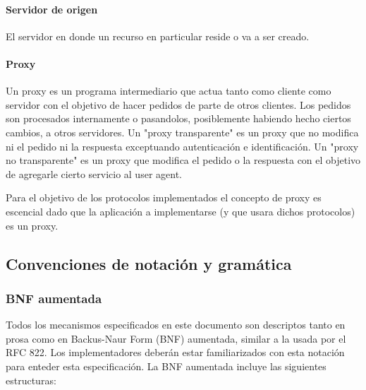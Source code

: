 \documentclass[a4paper,10pt]{article}
\begin{document}
            \paragraph*{Servidor de origen}

            El servidor en donde un recurso en particular reside o va a ser creado.

            \paragraph*{Proxy}

            Un proxy es un programa intermediario que actua tanto como cliente como servidor 
            con el objetivo de hacer pedidos de parte de otros clientes. Los pedidos son procesados internamente 
            o pasandolos, posiblemente habiendo hecho ciertos cambios, a otros servidores. Un 
            "proxy transparente" es un proxy que no modifica ni el pedido ni la respuesta exceptuando autenticaci\'on e 
            identificaci\'on. Un "proxy no transparente" es un proxy que modifica el pedido o la respuesta con el 
            objetivo de agregarle cierto servicio al user agent.

            Para el objetivo de los protocolos implementados el concepto de proxy es escencial dado que la aplicaci\'on 
            a implementarse (y que usara dichos protocolos) es un proxy.




    \subsection{Convenciones de notaci\'on y gram\'atica}

        \subsubsection{BNF aumentada}

        Todos los mecanismos especificados en este documento son descriptos tanto en prosa como en Backus-Naur Form (BNF) aumentada, similar a la usada por el RFC 822.
        \label{RFC 822}
        Los implementadores deber\'an estar familiarizados con esta notaci\'on para enteder esta especificaci\'on. La BNF aumentada incluye las siguientes estructuras:
\end{document}
